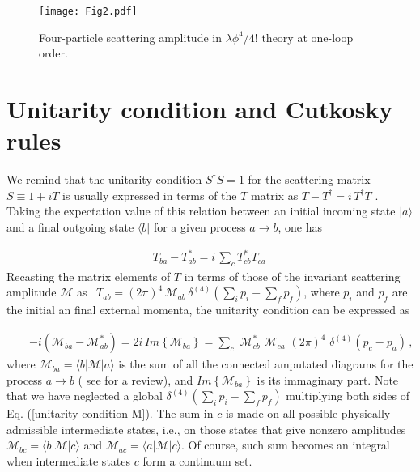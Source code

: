 \documentclass[a4paper,11pt]{article}
\newcommand{\be}{\begin{eqnarray}}
\newcommand{\ee}{\end{eqnarray}}
\begin{document}
\begin{figure}
	\begin{center}
		\hspace{-1cm}
		\texttt{[image: Fig2.pdf]}
	\end{center}
	\caption{Four-particle scattering amplitude in $\lambda \phi^4/4!$ theory at one-loop order.}
	\label{Fig2}
\end{figure}



\section{Unitarity condition and Cutkosky rules}\label{Section unitarity condition}

We remind that the unitarity condition $S^\dagger S =1$ for	the scattering matrix $S\equiv 1 + i T$ is usually  expressed in terms of the $T$ matrix as $T - T^\dagger  =  i	\, T^\dagger T$ \cite{peskin,itzykson zuber}. Taking the expectation value of this relation between an
initial incoming state $| a \rangle$ and a  final outgoing state $
\langle b |$ for a given process $a \rightarrow b$, one has

\be T_{ba}  - T^*_{ab}=  i \,  \sum_c T^*_{c b} T_{c a}  \, \ee
Recasting the matrix elements of  $T$  in terms of those
of the invariant scattering amplitude $\mathcal{M}$ as \mbox{
	$T_{ab} = (2 \pi)^4  \, \mathcal{M}_{ab} \,	\delta^{(4)}(\sum_i p_i - \sum_f p_f )$}, where $p_i$ and $p_f$ are the initial an final external momenta, the unitarity
condition can be expressed as



\be\label{unitarity condition M}
&&-i \left(\mathcal{M}_{ba} - \mathcal{M}^*_{ab}\right) = 2 i \,\textit{Im}\left\{\mathcal{M}_{ba}\right\} = \sum_c \,\, \mathcal{M}^*_{c
	b} \,\,\mathcal{M}_{c a} \,\, (2\pi)^4\,\, \delta^{(4)}(p_c-p_a) \, , \label{unitarityM}
\ee 
where $\mathcal{M}_{ba} = \langle b |
\mathcal{M} | a \rangle$ is the sum of all the connected amputated diagrams for the process $a \rightarrow b$ ( see \cite{peskin,itzykson zuber} for a review), and $\textit{Im}\left\{\mathcal{M}_{ba}\right\}$ is its immaginary part. Note that we have neglected a global $\delta^{(4)}(\sum_i p_i - \sum_f p_f )$ multiplying both sides of Eq. (\ref{unitarity condition M}). The sum in $c$ is made on all possible physically admissible intermediate states, i.e., on those states that give nonzero amplitudes $\mathcal{M}_{bc} = \langle b |
\mathcal{M} | c \rangle$ and $\mathcal{M}_{ac} = \langle a |\mathcal{M} | c \rangle$. Of course, such sum becomes an integral when intermediate states $c$ form a continuum set. 
\end{document}
